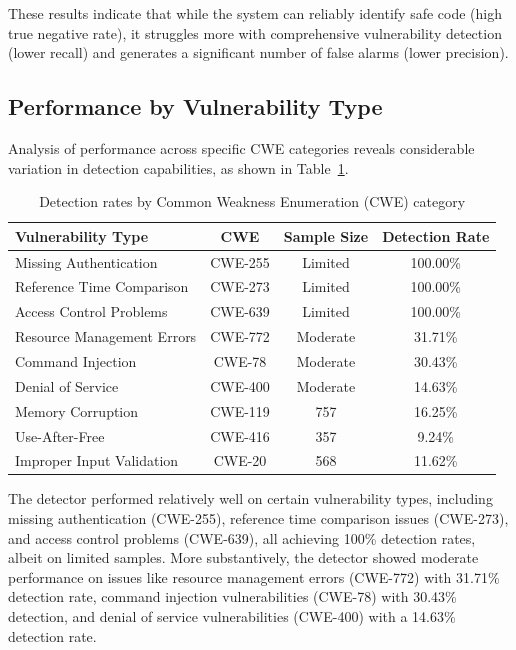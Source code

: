 \documentclass{article}
\begin{document}
These results indicate that while the system can reliably identify safe code (high true negative rate), it struggles more with comprehensive vulnerability detection (lower recall) and generates a significant number of false alarms (lower precision).

\subsection{Performance by Vulnerability Type}

Analysis of performance across specific CWE categories reveals considerable variation in detection capabilities, as shown in Table~\ref{tab:cwe_performance}.

\begin{table}[ht]
\centering
\begin{tabular}{lccc}
\hline
\textbf{Vulnerability Type} & \textbf{CWE} & \textbf{Sample Size} & \textbf{Detection Rate} \\
\hline
Missing Authentication & CWE-255 & Limited & 100.00\% \\
Reference Time Comparison & CWE-273 & Limited & 100.00\% \\
Access Control Problems & CWE-639 & Limited & 100.00\% \\
Resource Management Errors & CWE-772 & Moderate & 31.71\% \\
Command Injection & CWE-78 & Moderate & 30.43\% \\
Denial of Service & CWE-400 & Moderate & 14.63\% \\
Memory Corruption & CWE-119 & 757 & 16.25\% \\
Use-After-Free & CWE-416 & 357 & 9.24\% \\
Improper Input Validation & CWE-20 & 568 & 11.62\% \\
\hline
\end{tabular}
\caption{Detection rates by Common Weakness Enumeration (CWE) category}
\label{tab:cwe_performance}
\end{table}

The detector performed relatively well on certain vulnerability types, including missing authentication (CWE-255), reference time comparison issues (CWE-273), and access control problems (CWE-639), all achieving 100\% detection rates, albeit on limited samples. More substantively, the detector showed moderate performance on issues like resource management errors (CWE-772) with 31.71\% detection rate, command injection vulnerabilities (CWE-78) with 30.43\% detection, and denial of service vulnerabilities (CWE-400) with a 14.63\% detection rate.
\end{document}
